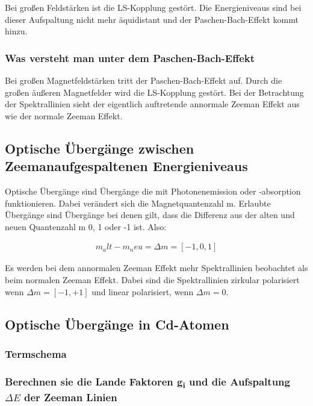 Bei großen Feldstärken ist die LS-Kopplung gestört. Die Energieniveaus sind bei dieser Aufspaltung nicht mehr äquidistant und der Paschen-Bach-Effekt kommt hinzu.

\subsubsection{Was versteht man unter dem Paschen-Bach-Effekt}

Bei großen Magnetfeldstärken tritt der Paschen-Bach-Effekt auf. Durch die großen äußeren Magnetfelder wird die LS-Kopplung gestört. Bei der Betrachtung der Spektrallinien sieht der eigentlich auftretende annormale Zeeman Effekt aus wie der normale Zeeman Effekt.

\subsection{Optische Übergänge zwischen Zeemanaufgespaltenen Energieniveaus}

Optische Übergänge sind Übergänge die mit Photonenemission oder -absorption funktionieren. Dabei verändert sich die Magnetquantenzahl m. Erlaubte Übergänge sind Übergänge bei denen gilt, dass die Differenz aus der alten und neuen Quantenzahl m 0, 1 oder -1 ist. Also:

\begin{align}
    m_alt - m_neu = \Delta m = [-1,0,1]
\end{align}

Es werden bei dem annormalen Zeeman Effekt mehr Spektrallinien beobachtet als beim normalen Zeeman Effekt. Dabei sind die Spektrallinien zirkular polarisiert wenn $\Delta m =  [-1,+1]$ und linear polarisiert, wenn $\Delta m = 0 $.   

\subsection{Optische Übergänge in Cd-Atomen}

\subsubsection{Termschema}

\subsubsection{Berechnen sie die Lande Faktoren g\textsubscript{i} und die Aufspaltung $\Delta E$ der Zeeman Linien}


